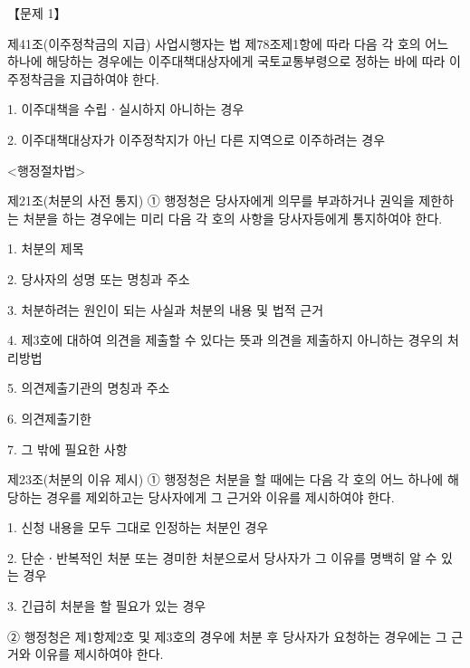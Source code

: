 \begin{longquestion}{【문제 1】}
\begin{framedtext}
제41조(이주정착금의 지급) 사업시행자는 법 제78조제1항에 따라 다음 각 호의 어느 하나에 해당하는 경우에는 이주대책대상자에게 국토교통부령으로 정하는 바에 따라 이주정착금을 지급하여야 한다. \par
1. 이주대책을 수립ㆍ실시하지 아니하는 경우 \par
2. 이주대책대상자가 이주정착지가 아닌 다른 지역으로 이주하려는 경우 \par
<행정절차법> \par
제21조(처분의 사전 통지) ① 행정청은 당사자에게 의무를 부과하거나 권익을 제한하는 처분을 하는 경우에는 미리 다음 각 호의 사항을 당사자등에게 통지하여야 한다. \par
1. 처분의 제목 \par
2. 당사자의 성명 또는 명칭과 주소 \par
3. 처분하려는 원인이 되는 사실과 처분의 내용 및 법적 근거 \par
4. 제3호에 대하여 의견을 제출할 수 있다는 뜻과 의견을 제출하지 아니하는 경우의 처리방법 \par
5. 의견제출기관의 명칭과 주소 \par
6. 의견제출기한 \par
7. 그 밖에 필요한 사항 \par
제23조(처분의 이유 제시) ① 행정청은 처분을 할 때에는 다음 각 호의 어느 하나에 해당하는 경우를 제외하고는 당사자에게 그 근거와 이유를 제시하여야 한다. \par
1. 신청 내용을 모두 그대로 인정하는 처분인 경우 \par
2. 단순ㆍ반복적인 처분 또는 경미한 처분으로서 당사자가 그 이유를 명백히 알 수 있는 경우 \par
3. 긴급히 처분을 할 필요가 있는 경우 \par
② 행정청은 제1항제2호 및 제3호의 경우에 처분 후 당사자가 요청하는 경우에는 그 근거와 이유를 제시하여야 한다. \par
\end{framedtext}
\end{longquestion}
